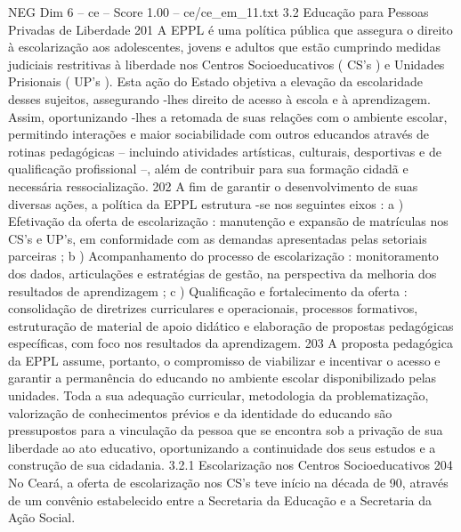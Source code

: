 \begin{textsample}{NEG Dim 6 – ce – Score 1.00 – ce/ce\_em\_11.txt}  \label{ex:f6_neg_256}
3.2 Educação para Pessoas Privadas de Liberdade 201 A EPPL é uma política pública que assegura o direito à escolarização aos adolescentes, jovens e adultos que estão cumprindo medidas judiciais restritivas à liberdade nos Centros Socioeducativos ( CS’s ) e Unidades Prisionais ( UP’s ).
Esta ação do Estado objetiva a elevação da escolaridade desses sujeitos, assegurando -lhes direito de acesso à escola e à aprendizagem.
Assim, oportunizando -lhes a retomada de suas relações com o ambiente escolar, permitindo interações e maior sociabilidade com outros educandos através de rotinas pedagógicas – incluindo atividades artísticas, culturais, desportivas e de qualificação profissional –, além de contribuir para sua formação cidadã e necessária ressocialização. 202 A fim de garantir o desenvolvimento de suas diversas ações, a política da EPPL estrutura -se nos seguintes eixos : a ) Efetivação da oferta de escolarização : manutenção e expansão de matrículas nos CS’s e UP’s, em conformidade com as demandas apresentadas pelas setoriais parceiras ; b ) Acompanhamento do processo de escolarização : monitoramento dos dados, articulações e estratégias de gestão, na perspectiva da melhoria dos resultados de aprendizagem ; c ) Qualificação e fortalecimento da oferta : consolidação de diretrizes curriculares e operacionais, processos formativos, estruturação de material de apoio didático e elaboração de propostas pedagógicas específicas, com foco nos resultados da aprendizagem. 203 A proposta pedagógica da EPPL assume, portanto, o compromisso de viabilizar e incentivar o acesso e garantir a permanência do educando no ambiente escolar disponibilizado pelas unidades.
Toda a sua adequação curricular, metodologia da problematização, valorização de conhecimentos prévios e da identidade do educando são pressupostos para a vinculação da pessoa que se encontra sob a privação de sua liberdade ao ato educativo, oportunizando a continuidade dos seus estudos e a construção de sua cidadania. 3.2.1 Escolarização nos Centros Socioeducativos 204 No Ceará, a oferta de escolarização nos CS’s teve início na década de 90, através de um convênio estabelecido entre a Secretaria da Educação e a Secretaria da Ação Social.

\end{textsample}
